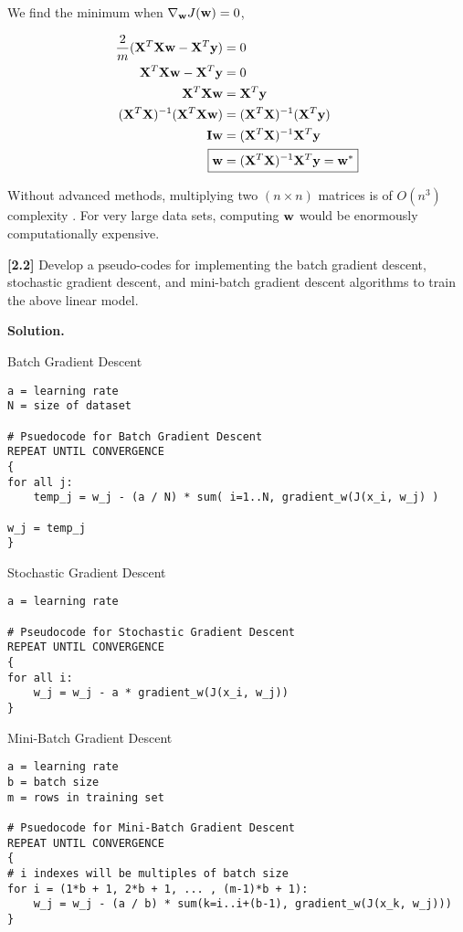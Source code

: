 \documentclass[11pt]{article}
\begin{document}
\begin{enumerate}[start=1,label={\bfseries Question \arabic*:},leftmargin=1in]
        We find the minimum when \(\nabla_{\vb{w}} J (\vb{w}) = 0\),

        \begin{align}
            \frac{2}{m} (\vb{X}^T\vb{X}\vb{w} - \vb{X}^T\vb{y} ) &= 0 \\
            \vb{X}^T\vb{X}\vb{w} - \vb{X}^T\vb{y} &= 0 \\
            \vb{X}^T\vb{X}\vb{w} &= \vb{X}^T\vb{y} \\
            (\vb{X}^T\vb{X})^{-1} ( \vb{X}^T\vb{X}\vb{w} ) &= (\vb{X}^T\vb{X})^{-1} ( \vb{X}^T\vb{y}) \\
            \vb{I}\vb{w} &= (\vb{X}^T\vb{X})^{-1} \vb{X}^T\vb{y} \\
            \Aboxed{\vb{w} &= (\vb{X}^T\vb{X})^{-1} \vb{X}^T\vb{y} = \vb{w}^*}
        \end{align}

        Without advanced methods, multiplying two \((n\times n)\) matrices is of \(O(n^3)\) complexity \cite{matrixcompute}. For very large data sets, computing \(\vb{w}\) would be enormously computationally expensive.
        
        \textbf{[2.2]} Develop a pseudo-codes for implementing the batch gradient descent, stochastic gradient descent, and mini-batch gradient descent algorithms to train the above linear model.

        \textbf{Solution.}

        Batch Gradient Descent
        \begin{lstlisting}
a = learning rate
N = size of dataset 

# Psuedocode for Batch Gradient Descent 
REPEAT UNTIL CONVERGENCE
{
for all j:
    temp_j = w_j - (a / N) * sum( i=1..N, gradient_w(J(x_i, w_j) )

w_j = temp_j
}
        \end{lstlisting}
        
        Stochastic Gradient Descent
        \begin{lstlisting}
a = learning rate

# Pseudocode for Stochastic Gradient Descent
REPEAT UNTIL CONVERGENCE
{
for all i:
    w_j = w_j - a * gradient_w(J(x_i, w_j))
}
        \end{lstlisting}
        
        Mini-Batch Gradient Descent
        \begin{lstlisting}
a = learning rate
b = batch size
m = rows in training set 

# Psuedocode for Mini-Batch Gradient Descent
REPEAT UNTIL CONVERGENCE
{
# i indexes will be multiples of batch size
for i = (1*b + 1, 2*b + 1, ... , (m-1)*b + 1):
    w_j = w_j - (a / b) * sum(k=i..i+(b-1), gradient_w(J(x_k, w_j)))
}
        \end{lstlisting}


\end{enumerate}
\end{document}
